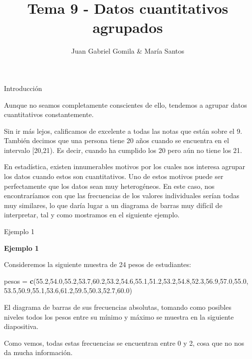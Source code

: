 \documentclass[
  ignorenonframetext,
]{beamer}
\title{Tema 9 - Datos cuantitativos agrupados}
\author{Juan Gabriel Gomila \& María Santos}
\date{}
\newenvironment{Shaded}{\begin{snugshade}}{\end{snugshade}}
\newcommand{\FloatTok}[1]{\textcolor[rgb]{0.00,0.00,0.81}{#1}}
\newcommand{\KeywordTok}[1]{\textcolor[rgb]{0.13,0.29,0.53}{\textbf{#1}}}
\newcommand{\NormalTok}[1]{#1}
\newcommand{\StringTok}[1]{\textcolor[rgb]{0.31,0.60,0.02}{#1}}
\begin{document}
\frame{\titlepage}

\begin{frame}{Introducción}
\protect\hypertarget{introducciuxf3n}{}

Aunque no seamos completamente conscientes de ello, tendemos a agrupar
datos cuantitativos constantemente.

Sin ir más lejos, calificamos de excelente a todas las notas que están
sobre el 9. También decimos que una persona tiene 20 años cuando se
encuentra en el intervalo {[}20,21). Es decir, cuando ha cumplido los 20
pero aún no tiene los 21.

En estadística, existen innumerables motivos por los cuales nos interesa
agrupar los datos cuando estos son cuantitativos. Uno de estos motivos
puede ser perfectamente que los datos sean muy heterogéneos. En este
caso, nos encontraríamos con que las frecuencias de los valores
individuales serían todas muy similares, lo que daría lugar a un
diagrama de barras muy difícil de interpretar, tal y como mostramos en
el siguiente ejemplo.

\end{frame}

\begin{frame}[fragile]{Ejemplo 1}
\protect\hypertarget{ejemplo-1}{}

\textbf{Ejemplo 1}

Consideremos la siguiente muestra de 24 pesos de estudiantes:

\begin{Shaded}
\begin{Highlighting}[]
\NormalTok{pesos =}\StringTok{ }\KeywordTok{c}\NormalTok{(}\FloatTok{55.2}\NormalTok{,}\FloatTok{54.0}\NormalTok{,}\FloatTok{55.2}\NormalTok{,}\FloatTok{53.7}\NormalTok{,}\FloatTok{60.2}\NormalTok{,}\FloatTok{53.2}\NormalTok{,}\FloatTok{54.6}\NormalTok{,}\FloatTok{55.1}\NormalTok{,}\FloatTok{51.2}\NormalTok{,}\FloatTok{53.2}\NormalTok{,}\FloatTok{54.8}\NormalTok{,}\FloatTok{52.3}\NormalTok{,}\FloatTok{56.9}\NormalTok{,}\FloatTok{57.0}\NormalTok{,}\FloatTok{55.0}\NormalTok{,}
          \FloatTok{53.5}\NormalTok{,}\FloatTok{50.9}\NormalTok{,}\FloatTok{55.1}\NormalTok{,}\FloatTok{53.6}\NormalTok{,}\FloatTok{61.2}\NormalTok{,}\FloatTok{59.5}\NormalTok{,}\FloatTok{50.3}\NormalTok{,}\FloatTok{52.7}\NormalTok{,}\FloatTok{60.0}\NormalTok{)}
\end{Highlighting}
\end{Shaded}

El diagrama de barras de sus frecuencias absolutas, tomando como
posibles niveles todos los pesos entre su mínimo y máximo se muestra en
la siguiente diapositiva.

Como vemos, todas estas frecuencias se encuentran entre 0 y 2, cosa que
no nos da mucha información.

\end{frame}
\end{document}
